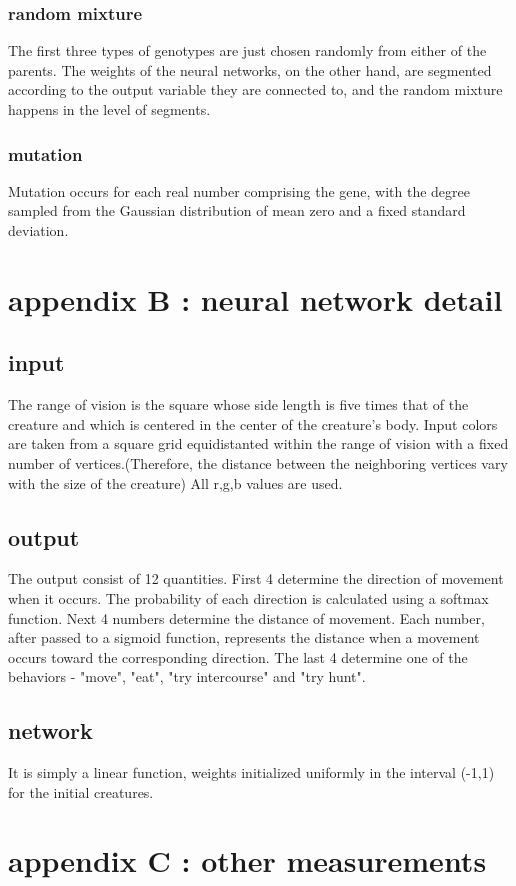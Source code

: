 \documentclass{article}
\numberwithin{equation}{section}
\begin{document}
\subsubsection{random mixture}
The first three types of genotypes are just chosen randomly from either of the parents. The weights of the neural networks, on the other hand, are segmented according to the output variable they are connected to, and the random mixture happens in the level of segments. 
\subsubsection{mutation}
Mutation occurs for each real number comprising the gene, with the degree sampled from the Gaussian distribution of mean zero and a fixed standard deviation. 


\section{appendix B : neural network detail}
\subsection{input}
The range of vision is the square whose side length is five times that of the creature and which is centered in the center of the creature's body. Input colors are taken from a square grid equidistanted within the range of vision with a fixed number of vertices.(Therefore, the distance between the neighboring vertices vary with the size of the creature) All r,g,b values are used.   
\subsection{output}
The output consist of 12 quantities. First 4 determine the direction of movement when it occurs. The probability of each direction is calculated using a softmax function. Next 4 numbers determine the distance of movement. Each number, after passed to a sigmoid function, represents the distance when a movement occurs toward the corresponding direction. The last 4 determine one of the behaviors - "move", "eat", "try intercourse" and "try hunt".  
\subsection{network} 
It is simply a linear function, weights initialized uniformly in the interval (-1,1) for the initial creatures.


\section{appendix C : other measurements}
\end{document}
